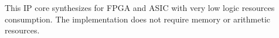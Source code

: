 This IP core synthesizes for FPGA and ASIC with very low logic resources
consumption. The implementation does not require memory or arithmetic resources.
